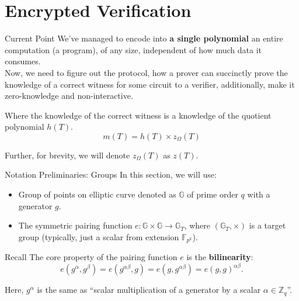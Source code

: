 \documentclass{zkdl-presentation-template}
\begin{document}
    \section{Encrypted Verification}

    \begin{frame}{Current Point}
        We've managed to encode into \textbf{a single polynomial} an entire computation (a program),
        of any size, independent of how much data it consumes. \\ \pause
        \vspace{10pt}
        Now, we need to figure out the protocol, how a prover can succinctly prove the knowledge of
        a correct witness for some circuit to a verifier, additionally, make it zero-knowledge and
        non-interactive.\pause

        Where the knowledge of the correct witness is a knowledge of the quotient polynomial $h(T)$.
        \begin{equation*}
            m(T) = h(T) \times z_{\Omega}(T)
        \end{equation*}

        \begin{remark}
            Further, for brevity, we will denote $z_{\Omega}(T)$ as $z(T)$.
        \end{remark}
    \end{frame}

    \begin{frame}{Notation Preliminaries: Groups}
        In this section, we will use:
        \begin{itemize}[label=]
            \item Group of points on elliptic curve
            denoted as $\mathbb{G}$ of prime order $q$ with a generator $g$.\pause
            \item The symmetric pairing function $e: \mathbb{G} \times \mathbb{G} \to \mathbb{G}_T$, where
            $(\mathbb{G}_T, \times)$ is a target group (typically, just a scalar from extension $\mathbb{F}_{p^k}$).
        \end{itemize}
        \pause
        \begin{remarkblock}{Recall}
            The core property of the pairing function $e$ is the \textbf{bilinearity}:
            \begin{equation*}
                e(g^{\alpha}, g^{\beta}) = e(g^{\alpha\beta}, g) = e(g, g^{\alpha\beta}) = e(g,g)^{\alpha\beta}.
            \end{equation*}

            Here, $g^{\alpha}$ is the same as ``scalar multiplication of a generator by a scalar $\alpha \in \mathbb{Z}_q$''.
        \end{remarkblock}
    \end{frame}
\end{document}
